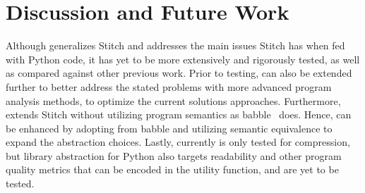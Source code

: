 \section{Discussion and Future Work}
\label{sec:conc}

Although \toolname generalizes Stitch \cite{Bowers_2023stitch} and addresses 
the main issues Stitch has when fed with Python code, it has yet to be more extensively and rigorously tested, 
as well as compared against other previous work. Prior to testing, \toolname can also be extended further to better address 
the stated problems with more advanced program analysis methods, to optimize the current solutions approaches. Furthermore, \toolname extends Stitch without utilizing program semantics as babble~\cite{Cao_2023babble} does. Hence, \toolname can be enhanced by adopting from babble and utilizing semantic equivalence to expand the abstraction choices. Lastly, currently \toolname is only tested for compression, but library abstraction for Python also targets readability and other program quality metrics that can be encoded in the utility function, and are yet to be tested. 







